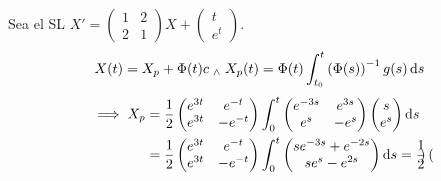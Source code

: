 \begin{ejem}
	Sea el SL $X' = \begin{pmatrix}
			1 & 2 \\
			2 & 1
		\end{pmatrix} X + \begin{pmatrix}
			t \\
			e^t
		\end{pmatrix}$.
	\[X(t) = X_p + \Phi(t) c \we X_p(t) = \Phi(t) \int_{t_0}^{t} \left(\Phi(s)\right)^{-1} g(s) \odif{s}\]
	\[\begin{aligned}
			\implies X_p & = \frac{1}{2} \begin{pmatrix}
				                             e^{3t} & e^{-t}  \\
				                             e^{3t} & -e^{-t}
			                             \end{pmatrix} \int_{0}^{t} \begin{pmatrix}
				                                                        e^{-3s} & e^{3s} \\
				                                                        e^{s}   & -e^{s}
			                                                        \end{pmatrix} \begin{pmatrix}
				                                                                      s \\
				                                                                      e^s
			                                                                      \end{pmatrix} \odif{s}                                                                                                    \\
			             & = \frac{1}{2} \begin{pmatrix}
				                             e^{3t} & e^{-t}  \\
				                             e^{3t} & -e^{-t}
			                             \end{pmatrix} \int_{0}^{t} \begin{pmatrix}
				                                                        s e^{-3s} + e^{-2s} \\
				                                                        s e^{s} - e^{2s}    \\
			                                                        \end{pmatrix} \odif{s}                                            = \frac{1}{2} \begin{pmatrix}

\end{pmatrix}
\end{aligned}\]
\end{ejem}
